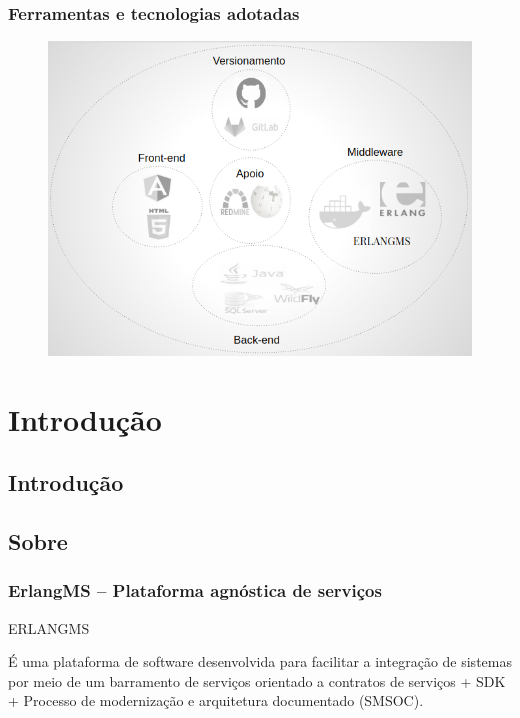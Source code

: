 \documentclass{beamer}
\begin{document}
\begin{frame}
\frametitle{Ferramentas e tecnologias adotadas}

\begin{figure}
	\centering
	\includegraphics[scale=0.25]{img/tec.png}
\end{figure}

\end{frame}






\section{Introdução}


\subsection{Introdução}






\subsection{Sobre}


\begin{frame}
  \frametitle{ErlangMS -- Plataforma agnóstica de serviços}

  \begin{exampleblock}{ERLANGMS}
  
É uma plataforma de software desenvolvida para facilitar a integração de sistemas por meio de um barramento 
de serviços orientado a contratos de serviços + SDK + Processo de modernização e arquitetura documentado (SMSOC).

  \end{exampleblock}

  
\end{frame}
\end{document}
